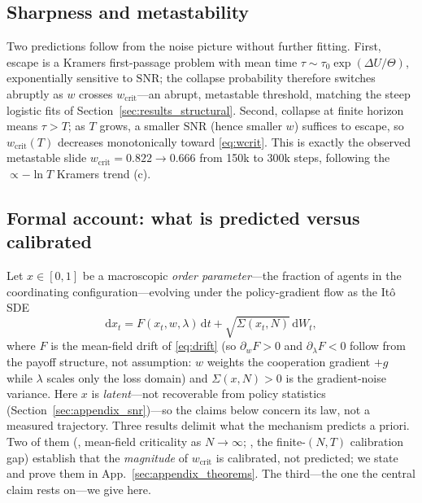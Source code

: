 \documentclass[letterpaper]{article}
\theoremstyle{plain}
\newcommand{\wcrit}{w_{\mathrm{crit}}}
\begin{document}
\subsection{Sharpness and metastability}
Two predictions follow from the noise picture without further fitting.
First, escape is a Kramers first-passage problem with mean time
$\tau\sim\tau_0\exp(\Delta U/\Theta)$, exponentially sensitive to
$\mathrm{SNR}$; the collapse probability therefore switches abruptly as $w$
crosses $\wcrit$---an abrupt, metastable threshold, matching the steep logistic
fits of Section~\ref{sec:results_structural}. Second, collapse at finite horizon
means $\tau>T$; as $T$ grows, a smaller $\mathrm{SNR}$ (hence smaller $w$)
suffices to escape, so $\wcrit(T)$ decreases monotonically toward
\eqref{eq:wcrit}. This is exactly the observed metastable slide
$\wcrit=0.822\!\to\!0.666$ from 150k to 300k steps, following the
$\propto-\ln T$ Kramers trend (c).

\subsection{Formal account: what is predicted versus calibrated}
\label{sec:meanfield_theorems}
Let $x\in[0,1]$ be a macroscopic \emph{order parameter}---the fraction of agents
in the coordinating configuration---evolving under the policy-gradient flow as the
It\^o SDE
\begin{equation}
  \mathrm{d}x_t = F(x_t,w,\lambda)\,\mathrm{d}t
    + \sqrt{\Sigma(x_t,N)}\,\mathrm{d}W_t,
  \label{eq:sde}
\end{equation}
where $F$ is the mean-field drift of \eqref{eq:drift} (so $\partial_w F>0$ and
$\partial_\lambda F<0$ follow from the payoff structure, not assumption: $w$
weights the cooperation gradient $+g$ while $\lambda$ scales only the loss
domain) and $\Sigma(x,N)>0$ is the gradient-noise variance. Here $x$ is
\emph{latent}---not recoverable from policy statistics
(Section~\ref{sec:appendix_snr})---so the claims below concern its law, not a
measured trajectory. Three results delimit what the mechanism predicts a priori. Two of them
(, mean-field criticality as $N\to\infty$; , the
finite-$(N,T)$ calibration gap) establish that the \emph{magnitude} of $\wcrit$
is calibrated, not predicted; we state and prove them in
App.~\ref{sec:appendix_theorems}. The third---the one the central claim rests
on---we give here.
\end{document}
